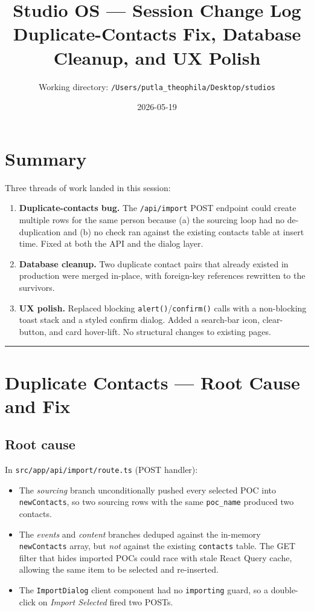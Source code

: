 \documentclass[11pt,a4paper]{article}
\title{\textbf{Studio OS --- Session Change Log}\\[4pt]
  \large Duplicate-Contacts Fix, Database Cleanup, and UX Polish}
\author{Working directory: \texttt{/Users/putla\_theophila/Desktop/studios}}
\date{2026-05-19}
\begin{document}
\maketitle

\section{Summary}

Three threads of work landed in this session:

\begin{enumerate}[leftmargin=*]
  \item \textbf{Duplicate-contacts bug.} The \texttt{/api/import} POST endpoint
        could create multiple rows for the same person because
        (a) the sourcing loop had no de-duplication and
        (b) no check ran against the existing contacts table at insert time.
        Fixed at both the API and the dialog layer.
  \item \textbf{Database cleanup.} Two duplicate contact pairs that already
        existed in production were merged in-place, with foreign-key
        references rewritten to the survivors.
  \item \textbf{UX polish.} Replaced blocking \texttt{alert()}/\texttt{confirm()}
        calls with a non-blocking toast stack and a styled confirm dialog.
        Added a search-bar icon, clear-button, and card hover-lift.
        No structural changes to existing pages.
\end{enumerate}

\hrule
\bigskip

\section{Duplicate Contacts --- Root Cause and Fix}

\subsection{Root cause}

In \texttt{src/app/api/import/route.ts} (POST handler):

\begin{itemize}[leftmargin=*]
  \item The \emph{sourcing} branch unconditionally pushed every selected POC
        into \texttt{newContacts}, so two sourcing rows with the same
        \texttt{poc\_name} produced two contacts.
  \item The \emph{events} and \emph{content} branches deduped against
        the in-memory \texttt{newContacts} array, but \emph{not} against the
        existing \texttt{contacts} table. The GET filter that hides imported
        POCs could race with stale React Query cache, allowing the same item
        to be selected and re-inserted.
  \item The \texttt{ImportDialog} client component had no \texttt{importing}
        guard, so a double-click on \emph{Import Selected} fired two POSTs.
\end{itemize}
\end{document}
